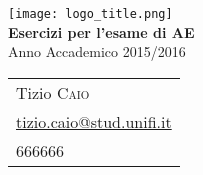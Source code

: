 \begin{center}
   	\texttt{[image: logo\_title.png]}\\[0.8cm]
    {\huge\bfseries Esercizi per l'esame di AE}\\
    Anno Accademico 2015/2016\\[0.8cm]

    \begin{tabular*}{\linewidth}{l}
        Tizio \textsc{Caio}\\
        \href{mailto:tizio.caio@stud.unifi.it}{tizio.caio@stud.unifi.it}\\
        666666
    \end{tabular*}\\[1.2cm]
\end{center}
